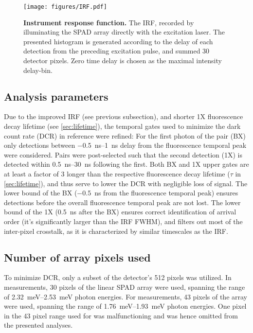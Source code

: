\documentclass[journal=nalefd, manuscript=letter, layout=twocolumn]{achemso}
\begin{document}
\begin{figure}
    \centering
    \texttt{[image: figures/IRF.pdf]}
    \caption{\textbf{Instrument response function.} The IRF, recorded by illuminating the SPAD array directly with the excitation laser. The presented histogram is generated according to the delay of each detection from the preceding excitation pulse, and summed 30 detector pixels. Zero time delay is chosen as the maximal intensity delay-bin.}
    \label{fig:IRF}
\end{figure}

\subsection{Analysis parameters}
\label{subsec:anaParams}
Due to the improved IRF (see previous subsection), and shorter 1X fluorescence decay lifetime (see \autoref{sec:lifetime}), the temporal gates used to minimize the dark count rate (DCR) in reference\cite{Lubin2021} were refined: For the first photon of the pair (BX) only detections between \SIrange{-0.5}{1}{ns} delay from the fluorescence temporal peak were considered. Pairs were post-selected such that the second detection (1X) is detected within \SIrange{0.5}{30}{ns} following the first. Both BX and 1X upper gates are at least a factor of 3 longer than the respective fluorescence decay lifetime ($\tau$ in \autoref{sec:lifetime}), and thus serve to lower the DCR with negligible loss of signal. The lower bound of the BX (\SI{-0.5}{ns} from the fluorescence temporal peak) ensures detections before the overall fluorescence temporal peak are not lost. The lower bound of the 1X (\SI{0.5}{ns} after the BX) ensures correct identification of arrival order (it's significantly larger than the IRF FWHM), and filters out most of the inter-pixel crosstalk, as it is characterized by similar timescales as the IRF.

\subsection{Number of array pixels used}
To minimize DCR, only a subset of the detector's 512 pixels was utilized. In  measurements, 30 pixels of the linear SPAD array were used, spanning the range of \SIrange{2.32}{2.53}{meV} photon energies. For  measurements, 43 pixels of the array were used, spanning the range of  \SIrange{1.76}{1.93}{meV} photon energies. One pixel in the 43 pixel range used for  was malfunctioning and was hence omitted from the presented analyses.
\end{document}
